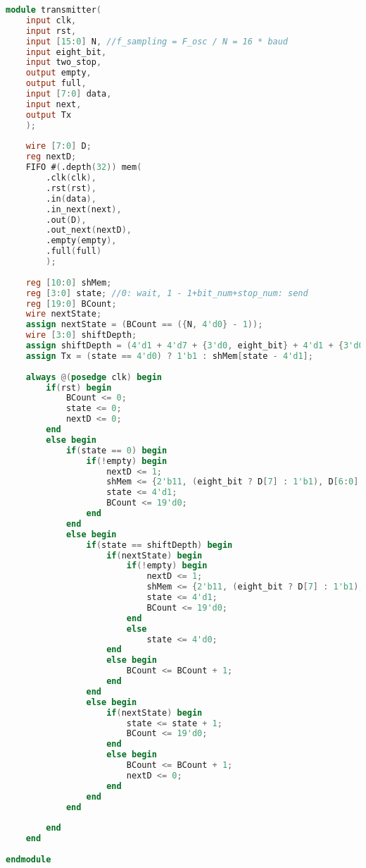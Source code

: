 \begin{lstlisting}[frame=single,language=verilog,caption={Transmit modul},captionpos=b,label={lst:trmt}]
module transmitter(
    input clk,
    input rst,
    input [15:0] N, //f_sampling = F_osc / N = 16 * baud
    input eight_bit,
    input two_stop,
    output empty,
    output full,
    input [7:0] data,
    input next,
    output Tx
    );
        
    wire [7:0] D;
    reg nextD;
    FIFO #(.depth(32)) mem(
        .clk(clk),
        .rst(rst),
        .in(data),
        .in_next(next),
        .out(D),
        .out_next(nextD),
        .empty(empty),
        .full(full)
        );
    
    reg [10:0] shMem;    
    reg [3:0] state; //0: wait, 1 - 1+bit_num+stop_num: send
    reg [19:0] BCount;
    wire nextState;
    assign nextState = (BCount == ({N, 4'd0} - 1));
    wire [3:0] shiftDepth;
    assign shiftDepth = (4'd1 + 4'd7 + {3'd0, eight_bit} + 4'd1 + {3'd0, two_stop}); //start_bit + 7_data_bits + eight_bit + stop_bit + 2nd_stop_bit
    assign Tx = (state == 4'd0) ? 1'b1 : shMem[state - 4'd1];
    
    always @(posedge clk) begin
        if(rst) begin
            BCount <= 0;
            state <= 0;
            nextD <= 0;
        end
        else begin
            if(state == 0) begin
                if(!empty) begin
                    nextD <= 1;
                    shMem <= {2'b11, (eight_bit ? D[7] : 1'b1), D[6:0], 1'b0}; //11 - eight_bit or stop bit - data - start bit
                    state <= 4'd1;
                    BCount <= 19'd0;
                end
            end
            else begin
                if(state == shiftDepth) begin
                    if(nextState) begin
                        if(!empty) begin
                            nextD <= 1;
                            shMem <= {2'b11, (eight_bit ? D[7] : 1'b1), D[6:0], 1'b0}; //11 - eight_bit or stop bit - data - start bit
                            state <= 4'd1;
                            BCount <= 19'd0;
                        end
                        else
                            state <= 4'd0;
                    end
                    else begin
                        BCount <= BCount + 1;
                    end
                end
                else begin
                    if(nextState) begin
                        state <= state + 1;
                        BCount <= 19'd0;
                    end
                    else begin
                        BCount <= BCount + 1;
                        nextD <= 0;
                    end
                end
            end
            
        end
    end
    
endmodule
\end{lstlisting}
